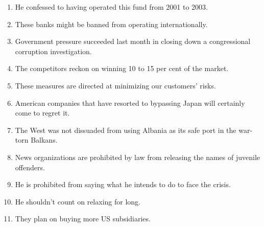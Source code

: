 \documentclass[main.tex]{subfiles}
\begin{document}

\begin{enumerate}[nosep,leftmargin=*]
	\itemsep\eitsp
	\item He confessed to having operated this fund from 2001 to 2003.
	\item These banks might be banned from operating internationally.
	\item Government pressure succeeded last month in closing down a congressional corruption investigation.
	\item The competitors reckon on winning 10 to 15 per cent of the market.
	\item These measures are directed at minimizing our customers' risks.
	\item American companies that have resorted to bypassing Japan will certainly come to regret it.
	\item The West was not dissuaded from using Albania as its safe port in the war-torn Balkans.
	\item News organizations are prohibited by law from releasing the names of juvenile offenders.
	\item He is prohibited from saying what he intends to do to face the crisis.
	\item He shouldn't count on relaxing for long.
	\item They plan on buying more US subsidiaries.
\end{enumerate}
\ 

\end{document}
